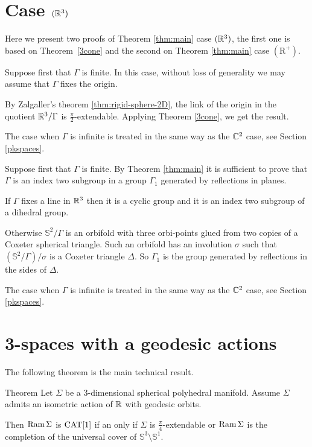 \documentclass[oneside,a4paper]{article}
\def\Ram{\mathop{\rm Ram}\nolimits}
\def\SS{\mathbb{S}}
\begin{document}
\section{Case $(\mathbb{R}^3)$}\label{3R}

Here we present two proofs of Theorem \ref{thm:main} case $(\mathbb{R}^3)$, 
the first one is based on Theorem~\ref{3cone} and the second 
on Theorem \ref{thm:main} case $(\mathrm{R}^+)$.

Suppose first that $\Gamma$ is finite.
In this case, without loss of generality we may assume that $\Gamma$ fixes the origin.

By Zalgaller's theorem \ref{thm:rigid-sphere-2D}, the link of the origin in the 
quotient $\mathbb{R}^3/\Gamma$ is $\tfrac\pi2$-extendable.
Applying Theorem \ref{3cone}, we get the result.

The case when $\Gamma$ is infinite is treated in the same way as the $\mathbb{C}^2$ case,
see Section \ref{pkspaces}.
\qeds

Suppose first that $\Gamma$ is finite.
By Theorem \ref{thm:main}
it is sufficient to prove that
$\Gamma$ is an index two subgroup in a group $\Gamma_1$ generated by reflections in planes.

If $\Gamma$ fixes a line in $\mathbb{R}^3$ then it is a cyclic group and it is an index two subgroup of
a dihedral group.

Otherwise $\SS^2/\Gamma$ is an orbifold with three orbi-points glued
from two copies of a Coxeter spherical triangle.
Such an orbifold has an involution
$\sigma$ such that $(\SS^2/\Gamma)/\sigma$ is a Coxeter triangle $\Delta$. So $\Gamma_1$
is the group generated by reflections in the sides of $\Delta$.

The case when $\Gamma$ is infinite is treated in the same way as the $\mathbb{C}^2$ case,
see Section \ref{pkspaces}.
\qeds


\section{3-spaces with a geodesic actions}

The following theorem is the main technical result.

\begin{thm}{Theorem}\label{thm:3D-sphere}
Let $\Sigma$ be a 3-dimensional spherical polyhedral manifold.
Assume $\Sigma$ admits an isometric action of $\mathbb{R}$ with geodesic orbits.

Then $\Ram\Sigma$ is $\mathrm{CAT}[1]$ if an only if  $\Sigma$ is $\frac\pi4$-extendable
or $\Ram\Sigma$ is the completion of the universal cover of $\SS^3\setminus \SS^1$.
\end{thm}
\end{document}
